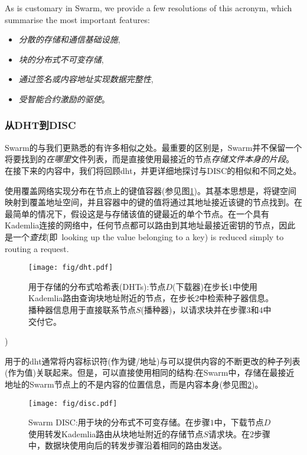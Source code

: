 As is customary in Swarm, we provide a few resolutions of this acronym, which summarise the most important features:


\begin{itemize}
\item \emph{分散的存储和通信基础设施}, 
\item \emph{块的分布式不可变存储}, 
\item \emph{通过签名或内容地址实现数据完整性},
\item \emph{受智能合约激励的驱使}。 

\end{itemize}
 
\subsubsection{从DHT到DISC}
Swarm的与我们更熟悉的有许多相似之处。最重要的区别是，Swarm并不保留一个将要找到的\emph{在哪里}文件列表，而是直接使用最接近的节点\emph{存储文件本身的片段}。
在接下来的内容中，我们将回顾dht，并更详细地探讨与DISC的相似和不同之处。 
 
使用覆盖网络实现分布在节点上的键值容器(参见图\ref{fig:DHT})。其基本思想是，将键空间映射到覆盖地址空间，并且容器中的键的值将通过其地址接近该键的节点找到。在最简单的情况下，假设这是与存储该值的键最近的单个节点。在一个具有Kademlia连接的网络中，任何节点都可以路由到其地址最接近密钥的节点，因此是一个\emph{查找}(即\ looking up the value belonging to a key) is reduced simply to routing a request.\begin{figure}[htbp]
   \centering
   \texttt{[image: fig/dht.pdf]}
   \caption[分布式哈希表(dht) \statusgreen]{用于存储的分布式哈希表(DHTs):节点$D$(下载器)在步长$1$中使用Kademlia路由查询块地址附近的节点，在步长$2$中检索种子器信息。播种器信息用于直接联系节点$S$(播种器)，以请求块并在步骤$3$和$4$中交付它。}
   \label{fig:DHT}
\end{figure})

用于的dht通常将内容标识符(作为键/地址)与可以提供内容\cite{ipfs2014, crosby2007analysis}的不断更改的种子列表(作为值)关联起来。但是，可以直接使用相同的结构:在Swarm中，存储在最接近地址的Swarm节点上的不是内容的位置信息，而是内容本身(参见图\ref{fig:disc})。 


\begin{figure}[htbp]
   \centering
   \texttt{[image: fig/disc.pdf]}
   \caption[Swarm DISC:分布式不可变存储块\statusgreen]{Swarm DISC:用于块的分布式不可变存储。在步骤$1$中，下载节点$D$使用转发Kademlia路由从块地址附近的存储节点$S$请求块。在$2$步骤中，数据块使用向后的转发步骤沿着相同的路由发送。   }
   \label{fig:disc}
\end{figure}

